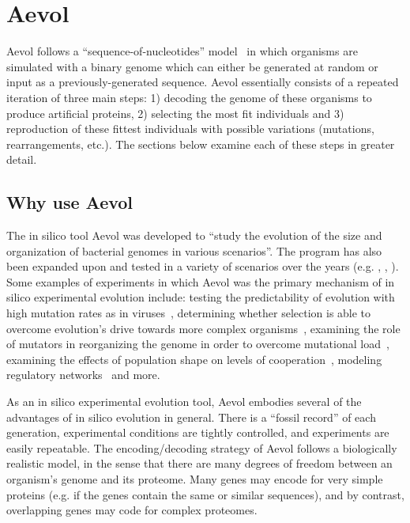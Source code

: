 \section{Aevol}
Aevol follows a ``sequence-of-nucleotides'' model~\cite{Batut.2013} in which organisms are simulated with a binary genome which can either be generated at random or input as a previously-generated sequence. Aevol essentially consists of a repeated iteration of three main steps: 1) decoding the genome of these organisms to produce artificial proteins, 2) selecting the most fit individuals and 3) reproduction of these fittest individuals with possible variations (mutations, rearrangements, etc.). The sections below examine each of these steps in greater detail.

\subsection{Why use Aevol}

The in silico tool Aevol was developed to ``study the evolution of the size and organization of bacterial genomes in various scenarios''\cite{Batut.2013}. The program has also been expanded upon and tested in a variety of scenarios over the years (e.g. \cite{parsons2011selection}, \cite{misevic2012effects}, \cite{Miramontes.2016}). Some examples of experiments in which Aevol was the primary mechanism of in silico experimental evolution include: testing the predictability of evolution with high mutation rates as in viruses~\cite{beslon:hal-01577115}, determining whether selection is able to overcome evolution's drive towards more complex organisms~\cite{Liard.2018}, examining the role of mutators in reorganizing the genome in order to overcome mutational load~\cite{doi:10.1186/s12862-019-1507-z}, examining the effects of population shape on levels of cooperation~\cite{Miramontes.2016}, modeling regulatory networks~\cite{sanchezdehesa:hal-01502737} and more. 

As an in silico experimental evolution tool, Aevol embodies several of the advantages of in silico evolution in general. There is a ``fossil record'' of each generation, experimental conditions are tightly controlled, and experiments are easily repeatable. The encoding/decoding strategy of Aevol follows a biologically realistic model, in the sense that there are many degrees of freedom between an organism's genome and its proteome. Many genes may encode for very simple proteins (e.g. if the genes contain the same or similar sequences), and by contrast, overlapping genes may code for complex proteomes.

